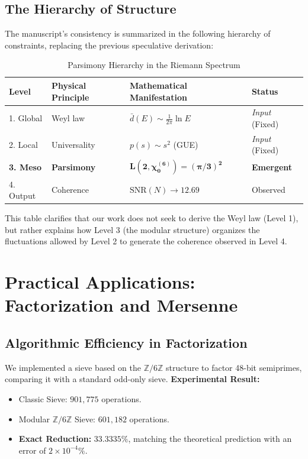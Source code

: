 \documentclass[12pt, a4paper]{article}
\theoremstyle{plain}
\theoremstyle{definition}
\theoremstyle{remark}
\begin{document}
\subsection{The Hierarchy of Structure}

The manuscript's consistency is summarized in the following hierarchy of constraints, replacing the previous speculative derivation:

\begin{table}[H]
\centering
\caption{Parsimony Hierarchy in the Riemann Spectrum}
\label{tab:jerarquia}
\begin{tabular}{@{}llll@{}}
\toprule
\textbf{Level} & \textbf{Physical Principle} & \textbf{Mathematical Manifestation} & \textbf{Status} \\ \midrule
1. Global & Weyl law & $\bar{d}(E) \sim \frac{1}{2\pi} \ln E$ & \textit{Input} (Fixed) \\
2. Local & Universality & $p(s) \sim s^2$ (GUE) & \textit{Input} (Fixed) \\
\textbf{3. Meso} & \textbf{Parsimony} & $\mathbf{L(2,\chi_0^{(6)}) = (\pi/3)^2}$ & \textbf{Emergent} \\
4. Output & Coherence & $\mathrm{SNR}(N) \to 12.69$ & Observed \\ \bottomrule
\end{tabular}
\end{table}

This table clarifies that our work does not seek to derive the Weyl law (Level 1), but rather explains how Level 3 (the modular structure) organizes the fluctuations allowed by Level 2 to generate the coherence observed in Level 4.

\section{Practical Applications: Factorization and Mersenne}
\label{ap:aplicaciones}

\subsection{Algorithmic Efficiency in Factorization}
We implemented a sieve based on the $\mathbb{Z}/6\mathbb{Z}$ structure to factor 48-bit semiprimes, comparing it with a standard odd-only sieve.
\textbf{Experimental Result:}
\begin{itemize}
    \item Classic Sieve: $901,775$ operations.
    \item Modular $\mathbb{Z}/6\mathbb{Z}$ Sieve: $601,182$ operations.
    \item \textbf{Exact Reduction:} $33.3335\%$, matching the theoretical prediction with an error of $2 \times 10^{-4}\%$.
\end{itemize}
\end{document}

